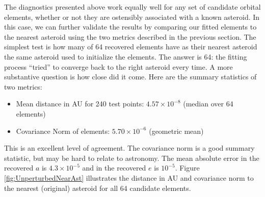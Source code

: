 The diagnostics presented above work equally well for any set of candidate orbital elements,
whether or not they are ostensibly associated with a known asteroid.
In this case, we can further validate the results by comparing our fitted elements to the nearest asteroid
using the two metrics described in the previous section.
The simplest test is how many of 64 recovered elements have as their nearest asteroid the same asteroid used to initialize the elements.
The answer is 64: the fitting process ``tried'' to converge back to the right asteroid every time.
A more substantive question is how close did it come.  
Here are the summary statistics of two metrics:
\begin{itemize}
\item Mean distance in AU for 240 test points: $4.57 \times 10^{-8}$ (median over 64 elements)
\item Covariance Norm of elements: $5.70 \times 10^{-6}$ (geometric mean)
\end{itemize}
This is an excellent level of agreement.
The covariance norm is a good summary statistic, but may be hard to relate to astronomy.
The mean absolute error in the recovered $a$ is $4.3 \times 10^{-5}$ and in the recovered $e$ is $10^{-5}$.
Figure \ref{fig:UnperturbedNearAst} illustrates the distance in AU and covariance norm to the nearest (original) asteroid for all 64 candidate elements.
